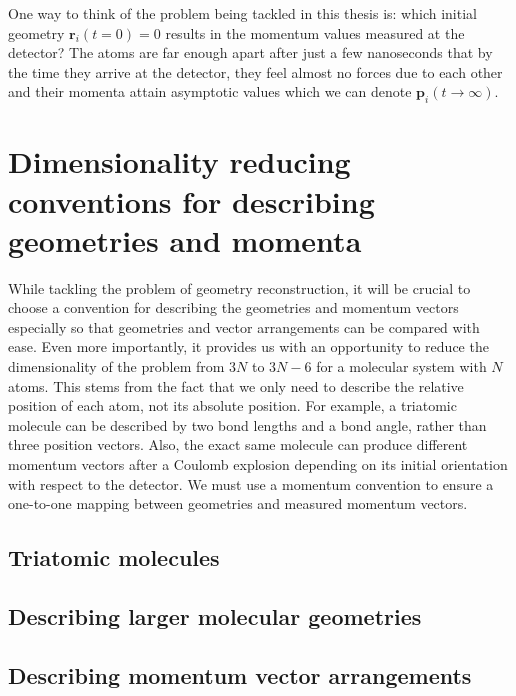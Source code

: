 One way to think of the problem being tackled in this thesis is: which initial geometry $\mathbf{r}_i(t=0) = 0$ results in the momentum values measured at the detector? The atoms are far enough apart after just a few nanoseconds that by the time they arrive at the detector, they feel almost no forces due to each other and their momenta attain asymptotic values which we can denote $\mathbf{p}_i(t\rightarrow\infty)$.

\section{Dimensionality reducing conventions for describing geometries and momenta} \label{sec:conventions}
While tackling the problem of geometry reconstruction, it will be crucial to choose a convention for describing the geometries and momentum vectors especially so that geometries and vector arrangements can be compared with ease. Even more importantly, it provides us with an opportunity to reduce the dimensionality of the problem from $3N$ to $3N-6$ for a molecular system with $N$ atoms. This stems from the fact that we only need to describe the relative position of each atom, not its absolute position. For example, a triatomic molecule can be described by two bond lengths and a bond angle, rather than three position vectors. Also, the exact same molecule can produce different momentum vectors after a Coulomb explosion depending on its initial orientation with respect to the detector. We must use a momentum convention to ensure a one-to-one mapping between geometries and measured momentum vectors.

\subsection{Triatomic molecules}
\subsection{Describing larger molecular geometries}
\subsection{Describing momentum vector arrangements}